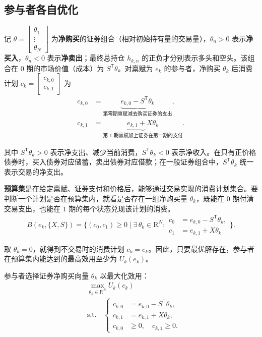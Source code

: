 \subsection{参与者各自优化}
记 $\theta=\begin{bmatrix}\theta_1 \\ \vdots \\ \theta_N\end{bmatrix}$ 为\textbf{净购买}的证券组合（相对初始持有量的交易量），$\theta_n>0$ 表示\textbf{净买入}，$\theta_n<0$ 表示\textbf{净卖出}；最终总持仓 $h_{k,n}$ 的正负才分别表示多头和空头。该组合在 0 期的市场价值（成本）为 $S^{\mathsf T}\theta$。对禀赋为 $e_k$ 的参与者，净购买 $\theta_k$ 后消费计划 $c_k=\begin{bmatrix}c_{k,0} \\ c_{k,1}\end{bmatrix}$ 为
    \[
    \begin{aligned}
        c_{k,0}&=\underbrace{e_{k,0}-S^{\mathsf T}\theta_k}_{\text{第零期禀赋减去购买证券的支出}},\\[1ex]
        c_{k,1}&=\underbrace{e_{k,1}+X\theta_k}_{\text{第 1 期禀赋加上证券在第一期的支付}}.
    \end{aligned}
    \]

    其中 $S^{\mathsf T}\theta_k>0$ 表示净支出、减少当前消费，$S^{\mathsf T}\theta_k<0$ 表示净收入。在只有正价格债券时，买入债券对应储蓄，卖出债券对应借款；在一般证券组合中，$S^{\mathsf T}\theta_k$ 统一表示交易的净支出。
\begin{tcolorbox}[knowledge,title=预算集]
\textbf{预算集}是在给定禀赋、证券支付和价格后，能够通过交易实现的消费计划集合。要判断一个计划是否在预算集内，就看是否存在一组净购买量 $\theta_k$，既能在 $0$ 期付清交易支出，也能在 $1$ 期的每个状态兑现该计划的消费。
    \[
        B(e_k,\{X,S\})
        =\biggl\{(c_0,c_1)\ge 0\;\bigg|\;
        \exists\,\theta_k\in\mathrm{R}^{N}:
        \begin{aligned}
         c_0&=e_{k,0}-S^{\mathsf T}\theta_k,\\
         c_1&=e_{k,1}+X\theta_k
        \end{aligned}
        \biggr\}.
    \]
\end{tcolorbox}

取 $\theta_k=0$，就得到不交易时的消费计划 $c_k=e_k$。因此，只要最优解存在，参与者在预算集内能达到的最高效用至少为 $U_k(e_k)$。

参与者选择证券净购买向量 $\theta_k$ 以最大化效用：
\[
\begin{aligned}
    &\max_{\theta_k\in\mathrm R^N} U_k(c_k) \\
    &\text{s.t.}\quad
    \left\{\begin{aligned}
        c_{k,0}&=e_{k,0}-S^{\mathsf T}\theta_k,\\
        c_{k,1}&=e_{k,1}+X\theta_k,\\
        c_{k,0}&\ge0,\quad c_{k,1}\ge0.
    \end{aligned}\right.
\end{aligned}
\]


